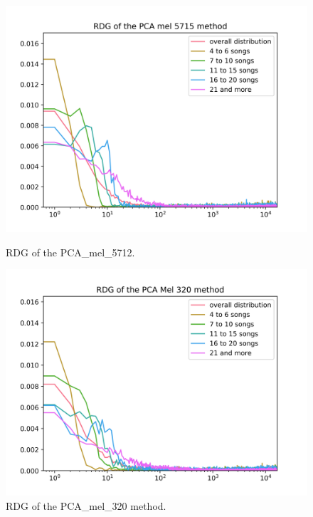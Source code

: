 \begin{figure}[h]
\centering
\begin{minipage}{.45\textwidth}
  \centering
  \includegraphics[width=1\linewidth]{./img/pca_mel_5715_graph.png}
  \caption[RDG of the PCA\_mel\_5712.]{RDG of the \newline PCA\_mel\_5712.}
  \label{fig:pca_mel_5715_distribution}
\end{minipage}
 \vspace{1cm}
\begin{minipage}{.45\textwidth}
  \centering
  \includegraphics[width=1\linewidth]{./img/pca_mel_320_graph.png}
  \caption[RDG of the PCA\_mel\_320 method]{RDG of the \newline PCA\_mel\_320 method.}
  \label{fig:pca_mel_320_distribution}
\end{minipage}
\end{figure}\label{fig:pca_mel_comparison_graps}

